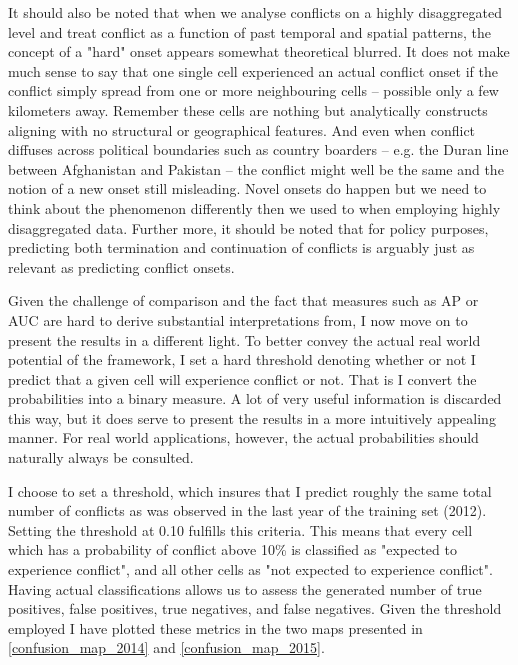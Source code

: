 \documentclass[a4paper]{article}
\begin{document}
It should also be noted that when we analyse conflicts on a highly disaggregated level and treat conflict as a function of past temporal and spatial patterns, the concept of a "hard" onset appears somewhat theoretical blurred. It does not make much sense to say that one single cell experienced an actual conflict onset if the conflict simply spread from one or more neighbouring cells -- possible only a few kilometers away. Remember these cells are nothing but analytically constructs aligning with no structural or geographical features. And even when conflict diffuses across political boundaries such as country boarders  -- e.g. the Duran line between Afghanistan and Pakistan --  the conflict might well be the same and the notion of a new onset still misleading. Novel onsets do happen but we need to think about the phenomenon differently then we used to when employing highly disaggregated data. Further more, it should be noted that for policy purposes, predicting both termination and continuation of conflicts is arguably just as relevant as predicting conflict onsets.\par  

Given the challenge of comparison and the fact that measures such as AP or AUC are hard to derive substantial interpretations from, I now move on to present the results in a different light. To better convey the actual real world potential of the framework, I set a hard threshold denoting whether or not I predict that a given cell will experience conflict or not. That is I convert the probabilities into a binary measure. A lot of very useful information is discarded this way, but it does serve to present the results in a more intuitively appealing manner. For real world applications, however, the actual probabilities should naturally always be consulted.\par

I choose to set a threshold, which insures that I predict roughly the same total number of conflicts as was observed in the last year of the training set (2012). Setting the threshold at 0.10 fulfills this criteria. This means that every cell which has a probability of conflict above 10\% is classified as "expected to experience conflict", and all other cells as "not expected to experience conflict". Having actual classifications allows us to assess the generated number of true positives, false positives, true negatives, and false negatives. Given the threshold employed I have plotted these metrics in the two maps presented in \autoref{confusion_map_2014} and \autoref{confusion_map_2015}.\par
\end{document}
